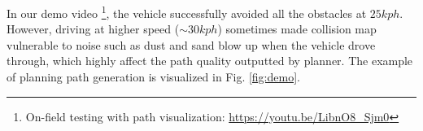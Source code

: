 \documentclass[../thesis.tex]{subfiles}
\begin{document}
In our demo video \footnote{On-field testing with path visualization: \url{https://youtu.be/LibnO8_Sjm0}}, the vehicle successfully avoided all the obstacles at $25 kph$. However, driving at higher speed ($\sim 30kph$) sometimes made collision map vulnerable to noise such as dust and sand blow up when the vehicle drove through, which highly affect the path quality outputted by planner. The example of planning path generation is visualized in Fig. \ref{fig:demo}.

 
\end{document}
